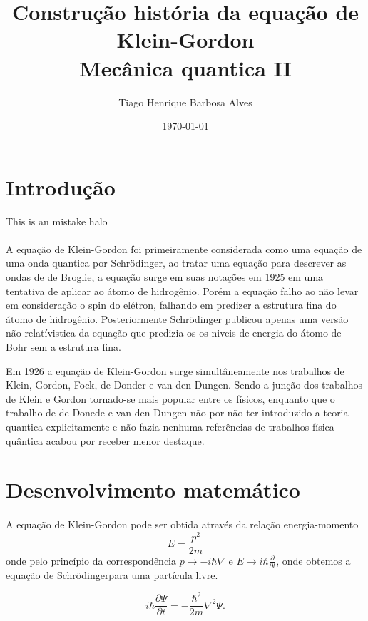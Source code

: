 \documentclass[a4paper,14pt]{extarticle}
\title{Construção história da equação de Klein-Gordon\\ Mecânica quantica II}%
\author{Tiago Henrique Barbosa Alves}
\date{\today}
\begin{document}
\maketitle


\section{Introdução}
This is an mistake
halo
\paragraph{} A equação de Klein-Gordon foi primeiramente considerada como uma equação de uma
onda quantica por Schrödinger, ao 
tratar uma equação para descrever as ondas de de Broglie, a equação surge em suas notações em 1925 em uma tentativa 
de aplicar ao átomo de hidrogênio. Porém a equação falho ao não levar em consideração o spin do elétron,
falhando em predizer a estrutura fina do átomo de hidrogênio. Posteriormente Schrödinger publicou apenas uma versão não 
relatívistica da equação que predizia os os niveis de energia do átomo de Bohr sem a estrutura fina.\cite{Kragh1984}

Em 1926 a equação de Klein-Gordon surge simultâneamente nos trabalhos de Klein\cite{Klein:1926fj},
Gordon\cite{Gordon1926}, Fock, de Donder e van den Dungen\cite{deDonder1926}. Sendo a junção dos trabalhos de Klein e Gordon tornado-se mais
popular entre os físicos, enquanto que o trabalho de de Donede e van den Dungen não por não ter introduzido 
a teoria quantica explicitamente e não fazia nenhuma referências de trabalhos física quântica acabou por receber menor destaque.


\section{Desenvolvimento matemático}

\paragraph{} A equação de Klein-Gordon pode ser obtida através da relação energia-momento
\begin{equation}
  E=\frac{p^2}{2m} 
\end{equation}
onde pelo princípio da correspondência $p\rightarrow -i \hbar \nabla $ e $E \rightarrow i \hbar \frac{\partial}{\partial t}$, onde 
obtemos a equação de Schrödingerpara uma partícula livre.

\begin{equation}
  i\hbar \frac{\partial \Psi}{\partial t} = -\frac{\hbar ^2}{2m} \nabla^2 \Psi .
\end{equation}
\end{document}

